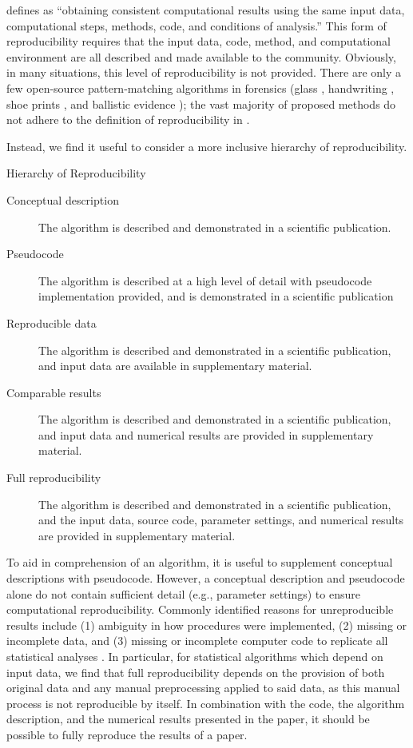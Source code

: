 \citet{nas_2019} defines  as ``obtaining consistent
computational results using the same input data, computational steps,
methods, code, and conditions of analysis.'' This form of
reproducibility requires that the input data, code, method, and
computational environment are all described and made available to the
community. Obviously, in many situations, this level of reproducibility
is not provided. There are only a few open-source pattern-matching
algorithms in forensics (glass \citep{park2019}, handwriting
\citep{crawford_handwriting_2020}, shoe prints
\citep{park_algorithm_2020}, and ballistic evidence
\citep{hare_automatic_2016,tai_fully_2018}); the vast majority of
proposed methods do not adhere to the definition of reproducibility in
\citet{nas_2019}.

Instead, we find it useful to consider a more inclusive hierarchy of
reproducibility.

\begin{definition} Hierarchy of Reproducibility \label{reprod-defn}

\begin{description}
\item[Conceptual description] The algorithm is described and demonstrated in a scientific publication.
\item[Pseudocode] The algorithm is described at a high level of detail with pseudocode implementation provided, and is demonstrated in a scientific publication
\item[Reproducible data] The algorithm is described and demonstrated in a scientific publication, and input data are available in supplementary material.
\item[Comparable results] The algorithm is described and demonstrated in a scientific publication, and input data and numerical results are provided in supplementary material.
\item[Full reproducibility] The algorithm is described and demonstrated in a scientific publication, and the input data, source code, parameter settings, and numerical results are provided in supplementary material.
\end{description}
\end{definition}

To aid in comprehension of an algorithm, it is useful to supplement
conceptual descriptions with pseudocode. However, a conceptual
description and pseudocode alone do not contain sufficient detail (e.g.,
parameter settings) to ensure computational reproducibility. Commonly
identified reasons for unreproducible results include (1) ambiguity in
how procedures were implemented, (2) missing or incomplete data, and (3)
missing or incomplete computer code to replicate all statistical
analyses \citep{leek_is_2017}. In particular, for statistical algorithms
which depend on input data, we find that full reproducibility depends on
the provision of both original data and any manual preprocessing applied
to said data, as this manual process is not reproducible by itself. In
combination with the code, the algorithm description, and the numerical
results presented in the paper, it should be possible to fully reproduce
the results of a paper.

